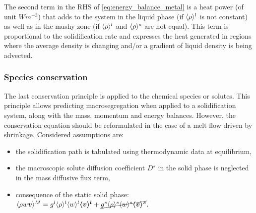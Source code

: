 %

The second term in the RHS of \cref{eq:energy_balance_metal} is a heat power (of unit $Wm^{-3}$) 
that adds to the system in the liquid phase (if $\langle \rho \rangle^l$ is not constant) as well as in the mushy zone (if $\langle \rho \rangle^l$ and $\langle \rho \rangle^s$ are not equal). 
This term is proportional to the solidification rate and expresses 
the heat generated in regions where the average density is changing and/or a gradient of liquid density is being advected.

\subsubsection{Species conservation}
The last conservation principle is applied to the chemical species or solutes. This principle allows predicting
macrosegregation when applied to a solidification system, along with the mass, momentum and energy balances.
However, the conservation equation should be reformulated in the case of a melt flow driven by shrinkage.
Considered assumptions are: 
\begin{itemize}
\itemsep0em
\item %
	  the solidification path is tabulated using thermodynamic data at equilibrium,
\item the macroscopic solute diffusion coefficient $D^s$ in the solid phase is neglected in the mass diffusive flux term,
\item consequence of the static solid phase: $\langle \rho w \boldsymbol{v} \rangle^M = {g^l} \langle \rho \rangle^l \langle w \rangle^l \boldsymbol{\langle v \rangle^l} +  \cancel{{g^s} \langle \rho \rangle^s \langle w \rangle^s \boldsymbol{\langle v \rangle^s}}$.
\end{itemize}

